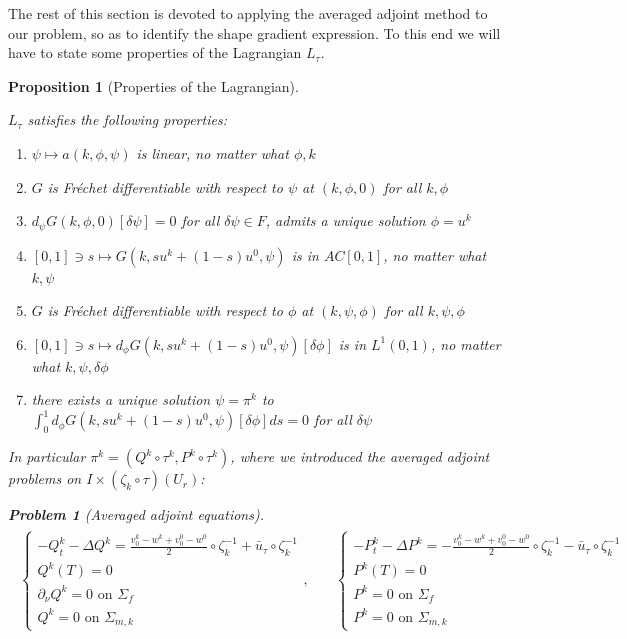 \documentclass[english,a4paper,9pt,oneside]{scrbook}	%
\theoremstyle{break}
\newtheorem{prop}[equation]{Proposition}
\newtheorem{pb}[equation]{Problem}
\theoremstyle{remark}
\newcommand{\ds}{\displaystyle}
\begin{document}
The rest of this section is devoted to applying the averaged adjoint method \cite{avg_adj} to our problem, so as to identify the shape gradient expression. To this end we will have to state some properties of the Lagrangian $L_\tau $.

\begin{prop}[Properties of the Lagrangian]
\label{prop:lagr}

$L_\tau$ satisfies the following properties:

\begin{enumerate}
	\item $\psi \mapsto a(k, \phi,\psi)$ is linear, no matter what $\phi,k$
	\item $G$ is Fréchet differentiable with respect to $\psi$ at $(k,\phi,0)$ for all $k, \phi$
	\item $d_\psi G(k,\phi,0)[\delta \psi]=0$ for all $\delta \psi \in F$, admits a unique solution $\phi = u^k$
	\item $[0,1]\ni s \mapsto G(k, su^k + (1-s)u^0,\psi)$ is in $AC[0,1]$, no matter what $k, \psi$
	\item $G$ is Fréchet differentiable with respect to $\phi$ at $(k,\psi,\phi)$ for all $k, \psi, \phi$
	\item $[0,1]\ni s \mapsto d_\phi G(k, su^k + (1-s)u^0,\psi)[\delta \phi]$ is in $L^1(0,1)$, no matter what $k, \psi, \delta \phi$
	\item there exists a unique solution $\psi = \pi^k$ to $\ds \int_0^1 d_\phi G(k, su^k + (1-s)u^0,\psi)[\delta \phi]ds =0$ for all $\delta \psi$ 
\end{enumerate}

In particular $\pi^k = (Q^k \circ \tau^k,P^k \circ \tau^k)$, where we introduced the averaged adjoint problems on $I\times (\zeta_k\circ \tau )(U_r)$:

\begin{pb}[Averaged adjoint equations]
\label{pb:avg_adj_pb}
\begin{align*}
\begin{matrix}
\left\{\begin{matrix}
-Q^k_t-\Delta Q^k =\frac{v_0^k-w^k+v_0^0-w^0}{2}\circ \zeta_k^{-1}+\bar{u}_\tau\circ \zeta_k^{-1}\\
Q^k(T)=0\\
\partial_\nu Q^k = 0 \text{ on } \Sigma_f\\
Q^k = 0 \text{ on } \Sigma_{m,k}
\end{matrix}\right.
, \quad &
\left\{\begin{matrix}
-P^k_t-\Delta P^k =-\frac{v_0^k-w^k+v_0^0-w^0}{2}\circ \zeta_k^{-1}-\bar{u}_\tau\circ \zeta_k^{-1}\\
P^k(T)=0\\
P^k = 0 \text{ on } \Sigma_f\\
P^k = 0 \text{ on } \Sigma_{m,k}
\end{matrix}\right.
\end{matrix}
\end{align*}
\end{pb}

\end{prop}
\end{document}
